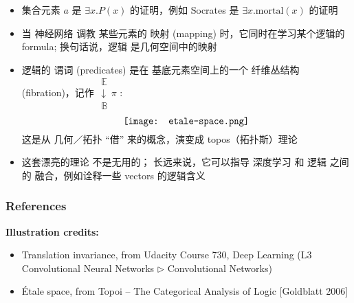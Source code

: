 \documentclass[16pt]{beamer}
\newcommand{\emp}[1]{{\color{violet}#1}}
\newif\ifframeinlbf
\begin{document}
\begin{frame}[plain]
\begin{itemize}
	\item 集合元素 $a$ 是 $\exists x. P(x)$ 的证明，例如 Socrates 是 $\exists x. \mbox{mortal}(x)$ 的证明
	\item 当 神经网络 \emp{调教} 某些元素的 映射 (mapping) 时，它同时在学习某个逻辑的 formula;  换句话说，逻辑 是几何空间中的映射
	\item 逻辑的 谓词 (predicates) 是在 基底元素空间上的一个 \emp{纤维丛结构} (fibration)，记作 $\mathrel{\substack{\mathbb{E}\\\downarrow \\\mathbb{B}}  {\scriptstyle \pi}}$ :
	\begin{equation}
	\vcenter{\hbox{\texttt{[image: etale-space.png]}}}
	\end{equation}
	这是从 几何／拓扑 ``借'' 来的概念，演变成 topos（拓扑斯）理论
	\item 这套漂亮的理论 不是无用的； 长远来说，它可以指导 深度学习 和 逻辑 之间的 融合，例如\emp{诠释}一些 vectors 的逻辑含义
\end{itemize}
\end{frame}

\frameinlbffalse
\begin{frame}
\frametitle{References}
\printbibliography
\textbf{Illustration credits:}
\begin{itemize}
	\item Translation invariance, from Udacity Course 730, Deep Learning (L3 Convolutional Neural Networks $\rhd$ Convolutional Networks)
	\item \'{E}tale space, from Topoi -- The Categorical Analysis of Logic [Goldblatt 2006]
\end{itemize}
\end{frame}
\end{document}
